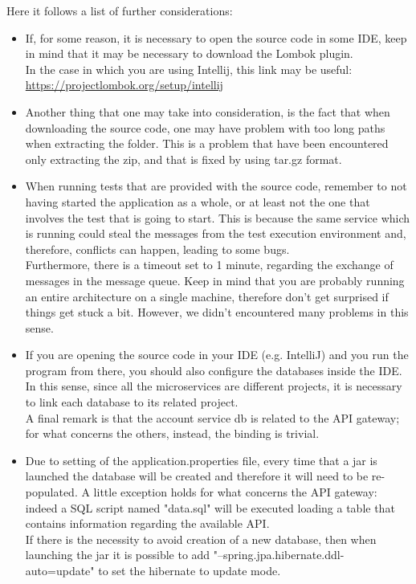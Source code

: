\par 
Here it follows a list of further considerations: 
\begin{itemize}
\item If, for some reason, it is necessary to open the source code in some IDE, keep in mind that it
may be necessary to download the Lombok plugin. \\
In the case in which you are using Intellij, this link may be useful:\\
\url{https://projectlombok.org/setup/intellij}

\item Another thing that one may take into consideration, is the fact that when downloading the source code, one may have problem with too long
paths when extracting the folder. This is a problem that have been encountered only extracting the zip, and that is fixed
by using tar.gz format. 

\item When running tests that are provided with the source code, remember to not having started the application as a whole, or at least not
the one that involves the test that is going to start. This is because the same service which is running could steal the messages from the test execution environment and, therefore, conflicts can happen, leading to some bugs. \\
Furthermore, there is a timeout set to 1 minute, regarding the exchange of messages in the message queue. Keep in mind that you are probably
running an entire architecture on a single machine, therefore don't get surprised if things get stuck a bit. However, we didn't encountered
many problems in this sense.

\item If you are opening the source code in your IDE (e.g. IntelliJ) and you run the program from there, you should also configure
the databases inside the IDE. In this sense, since all the microservices are different projects, it is necessary to link each database
to its related project. \\ A final remark is that the account service db is related to the API gateway; for what concerns the others, instead,
the binding is trivial.   

\item Due to setting of the application.properties file, every time that a jar is launched the database will be created and therefore
it will need to be re-populated. A little exception holds for what concerns the API gateway: indeed a SQL script named "data.sql" will be
executed loading a table that contains information regarding the available API. \\ 
If there is the necessity to avoid creation of a new database, then when launching the jar it is possible to add "--spring.jpa.hibernate.ddl-auto=update" to set the hibernate to update mode.

\end{itemize}

